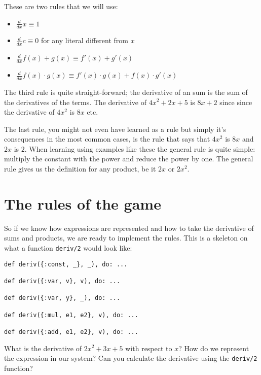 \documentclass[a4paper,11pt]{article}
\begin{document}
These are two rules that we will use:

\begin{itemize}
\item $\frac{d}{dx} x \equiv 1$
\item $\frac{d}{dx} c \equiv 0$  for any literal different from $x$
\item $\frac{d}{dx} f(x) + g(x) \equiv  f'(x) + g'(x)$
\item $\frac{d}{dx} f(x) \cdot  g(x) \equiv  f'(x) \cdot  g(x) + f(x) \cdot  g'(x)$
\end{itemize}

The third rule is quite straight-forward; the derivative of an sum is
the sum of the derivatives of the terms. The derivative of $4x^{2} + 2x + 5$ is $8x + 2$ since since the derivative of $4x^{2}$ is $8x$ etc.

The last rule, you might not even have learned as a rule but simply
it's consequences in the most common cases, is the rule that says that
$4x^{2}$ is $8x$ and $2x$ is $2$. When learning using examples like these
the general rule is quite simple: multiply the constant with the power
and reduce the power by one. The general rule gives us the definition
for any product, be it $2x$ or $2x^{2}$.



\section{The rules of the game}

So if we know how expressions are represented and how to take the
derivative of sums and products, we are ready to implement the
rules. This is a skeleton on what a function {\tt deriv/2} would look like:

\begin{verbatim}
def deriv({:const, _}, _), do: ...

def deriv({:var, v}, v), do: ...

def deriv({:var, y}, _), do: ...

def deriv({:mul, e1, e2}, v), do: ...

def deriv({:add, e1, e2}, v), do: ...
\end{verbatim}

What is the derivative of $2x^{2} + 3x + 5$ with respect to $x$? How do
we represent the expression in our system? Can you calculate the
derivative using the {\tt deriv/2} function?
\end{document}
